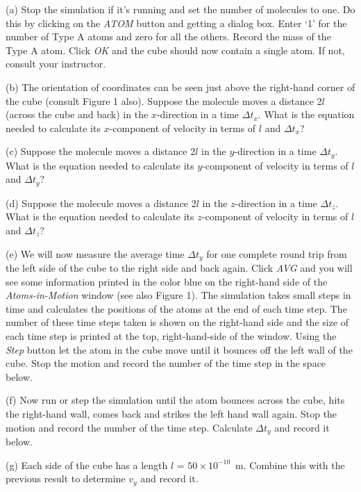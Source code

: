 (a) Stop the simulation if it's running and set the number of molecules to 
one. Do this by clicking on the {\it ATOM} button and getting a dialog box.
Enter `1' for the
number of Type A atoms and zero for all the others. Record the mass of the
Type A atom. Click {\it OK} and
the cube should now contain a single atom. If not, consult your instructor.
\answerspace{15mm}

(b) The orientation of coordinates can be seen just above the right-hand corner
of the cube (consult Figure 1 also).
Suppose the molecule moves a distance 2$l$ (across the cube and back) in the $x$-direction in
a time \( \Delta t_{x} \). What is the equation needed to calculate
its $x$-component of velocity in terms of $l$ and \( \Delta t_{x} \)?
\answerspace{15mm}

(c) Suppose the molecule moves a distance 2$l$ in the $y$-direction in
a time \( \Delta t_{y} \). What is the equation needed to calculate
its $y$-component of velocity in terms of $l$ and \( \Delta t_{y} \)?
\answerspace{15mm}

(d) Suppose the molecule moves a distance 2$l$ in the $z$-direction in
a time \( \Delta t_{z} \). What is the equation needed to calculate
its $z$-component of velocity in terms of $l$ and \( \Delta t_{z} \)?
\answerspace{15mm}

(e) We will now measure the average time $\Delta t_y$ for one complete round trip
from the left side of the cube to the right side and back again.
Click {\it AVG} and you will see some information printed in the color blue
on the right-hand side of the {\it Atoms-in-Motion} window (see also Figure 1).
The simulation takes small steps in time and calculates the positions of the
atoms at the end of each time step.
The number of these time steps taken is shown on the right-hand side and the size 
of each time step is printed at the top, right-hand-side of the window.
Using the {\it Step} button let the atom in the cube move until it bounces off the left wall of the cube. Stop the motion and record the number of the time step in the space below.
\answerspace{15mm}

(f) Now run or step the simulation until the atom bounces across the cube, hits the right-hand wall, comes back and strikes the left hand wall again. Stop the motion and record the number of the time step.
Calculate $\Delta t_y$ and record it below.
\vspace{15mm}

(g) Each side of the cube has a length $l$ = $50 \times 10^{-10}$~m.
Combine this with the previous result to determine $v_y$ and record it.
\answerspace{15mm}

